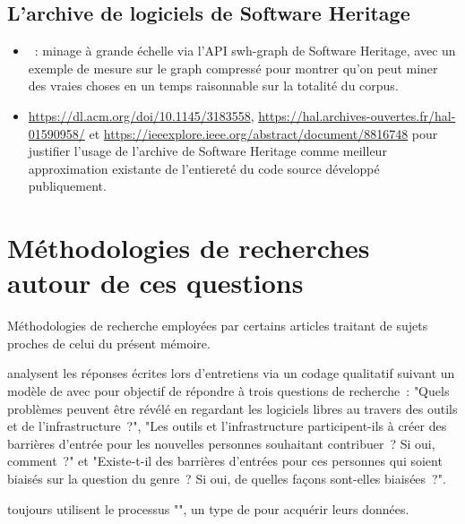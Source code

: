 \subsection{L'archive de logiciels de Software Heritage}


\begin{itemize}
    \item {} : minage à grande échelle via l'API swh-graph de Software Heritage,
        avec un exemple de mesure sur le graph compressé pour montrer qu'on peut miner des vraies choses en un
        temps raisonnable sur la totalité du corpus.
    \item \url{https://dl.acm.org/doi/10.1145/3183558}, \url{https://hal.archives-ouvertes.fr/hal-01590958/}
        et \url{https://ieeexplore.ieee.org/abstract/document/8816748} pour justifier l'usage de l'archive de
        Software Heritage comme meilleur approximation existante de l'entiereté du code source développé
        publiquement.
\end{itemize}

\section{Méthodologies de recherches autour de ces questions}

Méthodologies de recherche employées par certains articles traitant de sujets proches de celui du présent
mémoire.

\textcite[p.~1006]{barriers-2018} analysent les réponses écrites lors d'entretiens via un codage
qualitatif suivant un modèle de  avec pour objectif de répondre à trois questions
de recherche : "Quels problèmes peuvent être révélé en regardant les logiciels libres au travers des outils et
de l'infrastructure ?", "Les outils et l'infrastructure participent-ils à créer des barrières d'entrée pour
les nouvelles personnes souhaitant contribuer ? Si oui, comment ?" et "Existe-t-il des barrières d'entrées
pour ces personnes qui soient biaisés sur la question du genre ? Si oui, de quelles façons sont-elles
biaisées ?".

\textcite[p.~1006]{barriers-2018} toujours utilisent le processus "", un type de  pour acquérir leurs données.

